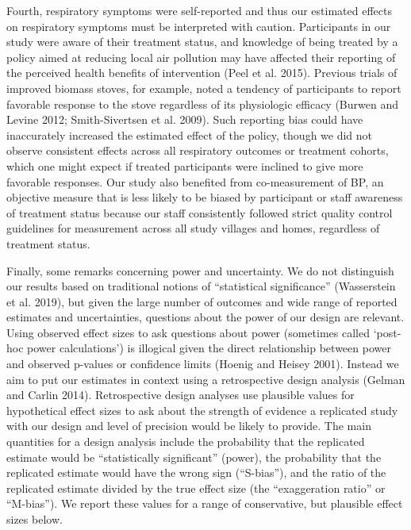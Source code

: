 \documentclass[
  letterpaper,
  DIV=11,
  numbers=noendperiod]{scrartcl}
\begin{document}
Fourth, respiratory symptoms were self-reported and thus our estimated
effects on respiratory symptoms must be interpreted with caution.
Participants in our study were aware of their treatment status, and
knowledge of being treated by a policy aimed at reducing local air
pollution may have affected their reporting of the perceived health
benefits of intervention (Peel et al. 2015). Previous trials of improved
biomass stoves, for example, noted a tendency of participants to report
favorable response to the stove regardless of its physiologic efficacy
(Burwen and Levine 2012; Smith-Sivertsen et al. 2009). Such reporting
bias could have inaccurately increased the estimated effect of the
policy, though we did not observe consistent effects across all
respiratory outcomes or treatment cohorts, which one might expect if
treated participants were inclined to give more favorable responses. Our
study also benefited from co-measurement of BP, an objective measure
that is less likely to be biased by participant or staff awareness of
treatment status because our staff consistently followed strict quality
control guidelines for measurement across all study villages and homes,
regardless of treatment status.

Finally,  some remarks concerning power and uncertainty.
We do not distinguish our results based on traditional notions of
``statistical significance'' (Wasserstein et al. 2019), but given the
large number of outcomes and wide range of reported estimates and
uncertainties, questions about the power of our design are relevant.
Using observed effect sizes to ask questions about power (sometimes
called `post-hoc power calculations') is illogical given the direct
relationship between power and observed p-values or confidence limits
(Hoenig and Heisey 2001). Instead we aim to put our estimates in context
using a retrospective design analysis (Gelman and Carlin 2014).
Retrospective design analyses use plausible values for hypothetical
effect sizes to ask about the strength of evidence a replicated study
with our design and level of precision would be likely to provide. The
main quantities for a design analysis include the probability that the
replicated estimate would be ``statistically significant'' (power), the
probability that the replicated estimate would have the wrong sign
(``S-bias''), and the ratio of the replicated estimate divided by the
true effect size (the ``exaggeration ratio'' or ``M-bias''). We report
these values for a range of conservative, but plausible effect sizes
below.
\end{document}
